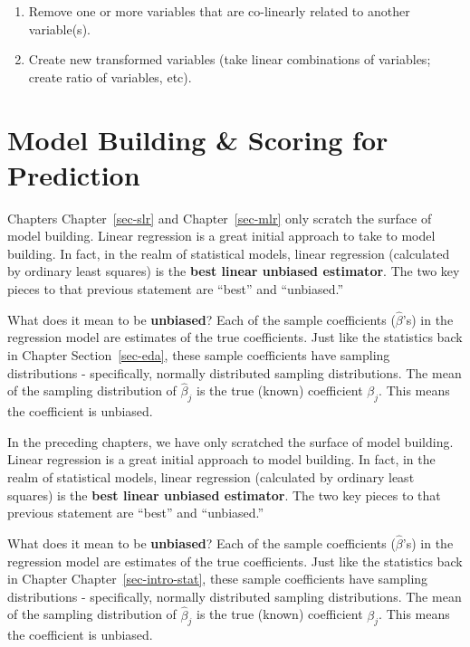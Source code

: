 \documentclass[
  letterpaper,
  DIV=11,
  numbers=noendperiod]{scrreprt}
\providecommand{\tightlist}{%
  \setlength{\itemsep}{0pt}\setlength{\parskip}{0pt}}\usepackage{longtable,booktabs,array}
\begin{document}
\begin{enumerate}
\def\labelenumi{\arabic{enumi}.}
\tightlist
\item
  Remove one or more variables that are co-linearly related to another
  variable(s).\\
\item
  Create new transformed variables (take linear combinations of
  variables; create ratio of variables, etc).
\end{enumerate}


\hypertarget{model}{%
\chapter{Model Building \& Scoring for Prediction}\label{model}}

Chapters Chapter~\ref{sec-slr} and Chapter~\ref{sec-mlr} only scratch
the surface of model building. Linear regression is a great initial
approach to take to model building. In fact, in the realm of statistical
models, linear regression (calculated by ordinary least squares) is the
\textbf{best linear unbiased estimator}. The two key pieces to that
previous statement are ``best'' and ``unbiased.''

What does it mean to be \textbf{unbiased}? Each of the sample
coefficients (\(\hat{\beta}\)'s) in the regression model are estimates
of the true coefficients. Just like the statistics back in Chapter
Section~\ref{sec-eda}, these sample coefficients have sampling
distributions - specifically, normally distributed sampling
distributions. The mean of the sampling distribution of
\(\hat{\beta}_j\) is the true (known) coefficient \(\beta_j\). This
means the coefficient is unbiased.

In the preceding chapters, we have only scratched the surface of model
building. Linear regression is a great initial approach to model
building. In fact, in the realm of statistical models, linear regression
(calculated by ordinary least squares) is the \textbf{best linear
unbiased estimator}. The two key pieces to that previous statement are
``best'' and ``unbiased.''

What does it mean to be \textbf{unbiased}? Each of the sample
coefficients (\(\hat{\beta}\)'s) in the regression model are estimates
of the true coefficients. Just like the statistics back in Chapter
Chapter~\ref{sec-intro-stat}, these sample coefficients have sampling
distributions - specifically, normally distributed sampling
distributions. The mean of the sampling distribution of
\(\hat{\beta}_j\) is the true (known) coefficient \(\beta_j\). This
means the coefficient is unbiased.
\end{document}
